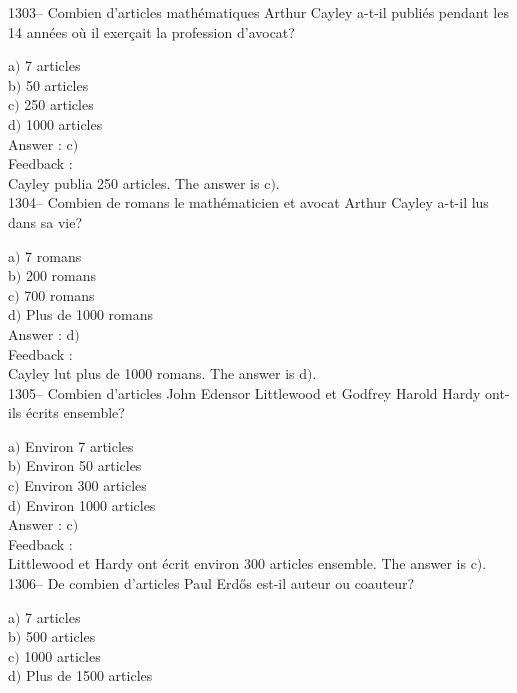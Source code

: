 \documentclass[letterpaper, 12pt]{article}
\begin{document}
1303-- Combien d'articles math\'ematiques Arthur Cayley a-t-il
publi\'es pendant les 14 ann\'ees o\`u il exer\c cait la profession
d'avocat?

a$)$ 7 articles \\
b$)$ 50 articles \\
c$)$ 250 articles\\
d$)$ 1000 articles\\

Answer : c$)$\\

Feedback : \\
Cayley publia 250 articles.
The answer is  c$)$.\\

1304-- Combien de romans le math\'ematicien et avocat Arthur Cayley
a-t-il lus dans sa vie?

a$)$ 7 romans \\
b$)$ 200 romans \\
c$)$ 700 romans\\
d$)$ Plus de 1000 romans\\

Answer : d$)$\\

Feedback : \\
Cayley lut plus de 1000 romans.
The answer is  d$)$.\\

1305-- Combien d'articles John Edensor Littlewood et Godfrey Harold
Hardy ont-ils \'ecrits ensemble?

a$)$ Environ 7 articles \\
b$)$ Environ 50 articles \\
c$)$ Environ 300 articles\\
d$)$ Environ 1000 articles\\

Answer : c$)$\\

Feedback : \\
Littlewood et Hardy ont \'ecrit environ 300 articles ensemble.
The answer is  c$)$.\\

1306-- De combien d'articles Paul Erd\H{o}s est-il auteur ou
coauteur?

a$)$ 7 articles \\
b$)$ 500 articles \\
c$)$ 1000 articles\\
d$)$ Plus de 1500 articles\\
\end{document}
